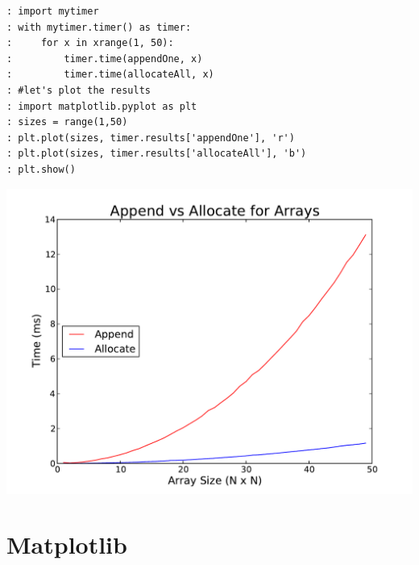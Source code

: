 \begin{lstlisting}[style=python]
: import mytimer
: with mytimer.timer() as timer:
:     for x in xrange(1, 50):
:         timer.time(appendOne, x)
:         timer.time(allocateAll, x)
: #let's plot the results
: import matplotlib.pyplot as plt
: sizes = range(1,50)
: plt.plot(sizes, timer.results['appendOne'], 'r')
: plt.plot(sizes, timer.results['allocateAll'], 'b')
: plt.show()
\end{lstlisting}

\begin{center}
\includegraphics[width=\textwidth]{alloc_vs_resize.pdf}
\end{center}



\section*{Matplotlib}


